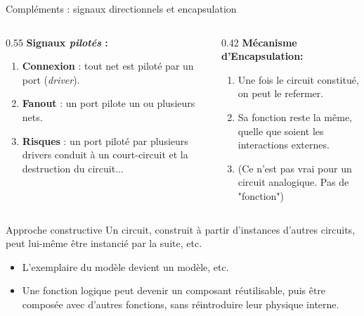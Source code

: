 \begin{frame}{Compléments : signaux directionnels et encapsulation}
  \begin{columns}[T]
    \begin{column}{0.55\textwidth}
      \textbf{Signaux \textit{pilotés} :}
      \begin{enumerate}
        \item \textbf{Connexion} : tout net est piloté par un port (\textit{driver}).
        \item \textbf{Fanout} : un port pilote un ou plusieurs nets.
        \item \textbf{Risques} : un port piloté par plusieurs drivers conduit à un court-circuit et la destruction du circuit...
      \end{enumerate}
    \end{column}
    \begin{column}{0.42\textwidth}
      \textbf{Mécanisme d'Encapsulation:}
      \begin{enumerate}
        \item Une fois le circuit constitué, on peut le refermer.
        \item Sa fonction reste la même, quelle que soient les interactions externes.
        \item (Ce n'est pas vrai pour un circuit analogique. Pas de "fonction")
      \end{enumerate}

    \end{column}
  \end{columns}
  \begin{exampleblock}{Approche constructive}
    Un circuit, construit à partir d'instances d'autres circuits, peut lui-même être instancié par la suite, etc.
    \begin{itemize}
      \item L'exemplaire du modèle devient un modèle, etc.
      \item Une fonction logique peut devenir un composant réutilisable, puis être composée avec d’autres
fonctions, sans réintroduire leur physique interne.
    \end{itemize}
  \end{exampleblock}
\end{frame}


